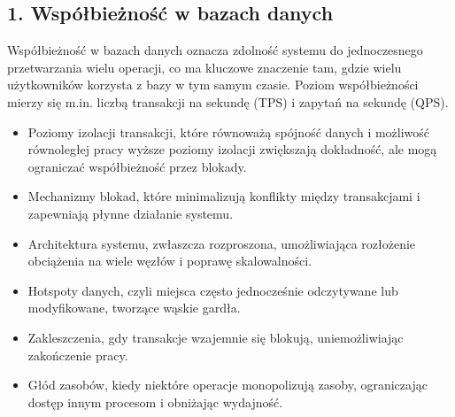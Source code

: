 \documentclass[a4paper,11pt,openany,english]{sphinxmanual}
\begin{document}
\subsection{1. Współbieżność w bazach danych}
\label{\detokenize{rozdzial2/index:wspolbieznosc-w-bazach-danych}}
\sphinxAtStartPar
Współbieżność w bazach danych oznacza zdolność systemu do jednoczesnego przetwarzania wielu operacji, co ma kluczowe znaczenie tam, gdzie wielu użytkowników korzysta z bazy w tym samym czasie. Poziom współbieżności mierzy się m.in. liczbą transakcji na sekundę (TPS) i zapytań na sekundę (QPS).
\begin{description}
\begin{itemize}
\item {} 
\sphinxAtStartPar
Poziomy izolacji transakcji, które równoważą spójność danych i możliwość równoległej pracy \textendash{} wyższe poziomy izolacji zwiększają dokładność, ale mogą ograniczać współbieżność przez blokady.

\item {} 
\sphinxAtStartPar
Mechanizmy blokad, które minimalizują konflikty między transakcjami i zapewniają płynne działanie systemu.

\item {} 
\sphinxAtStartPar
Architektura systemu, zwłaszcza rozproszona, umożliwiająca rozłożenie obciążenia na wiele węzłów i poprawę skalowalności.

\end{itemize}

\begin{itemize}
\item {} 
\sphinxAtStartPar
Hotspoty danych, czyli miejsca często jednocześnie odczytywane lub modyfikowane, tworzące wąskie gardła.

\item {} 
\sphinxAtStartPar
Zakleszczenia, gdy transakcje wzajemnie się blokują, uniemożliwiając zakończenie pracy.

\item {} 
\sphinxAtStartPar
Głód zasobów, kiedy niektóre operacje monopolizują zasoby, ograniczając dostęp innym procesom i obniżając wydajność.

\end{itemize}

\end{description}
\end{document}
